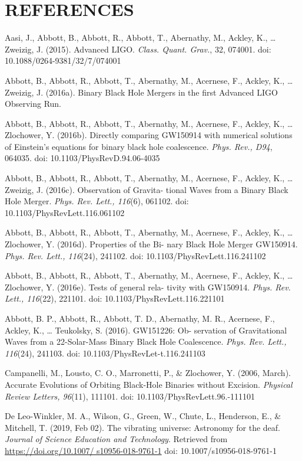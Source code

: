 \documentclass[11.5pt]{sig-alternate} %
\begin{document}
\section*{REFERENCES}\par 
\leftskip 0.25in
\parindent -0.25in 


Aasi, J., Abbott, B., Abbott, R., Abbott, T., Abernathy, M., Ackley, K., … Zweizig, J. (2015). Advanced LIGO. \textit{Class. Quant. Grav.}, 32, 074001. doi: 10.1088/0264-9381/32/7/074001 

Abbott, B., Abbott, R., Abbott, T., Abernathy, M., Acernese, F., Ackley, K., … Zweizig, J. (2016a). Binary Black Hole Mergers in the first Advanced LIGO Observing Run. 

Abbott, B., Abbott, R., Abbott, T., Abernathy, M., Acernese, F., Ackley, K., … Zlochower, Y. (2016b). Directly comparing GW150914 with numerical solutions of Einstein’s equations for binary black hole coalescence. \textit{Phys. Rev., D94}, 064035. doi: 10.1103/PhysRevD.94.06-4035 

Abbott, B., Abbott, R., Abbott, T., Abernathy, M., Acernese, F., Ackley, K., … Zweizig, J. (2016c). Observation of Gravita- tional Waves from a Binary Black Hole Merger. \textit{Phys. Rev. Lett., 116}(6), 061102. doi: 10.1103/PhysRevLett.116.061102 

Abbott, B., Abbott, R., Abbott, T., Abernathy, M., Acernese, F., Ackley, K., … Zlochower, Y. (2016d). Properties of the Bi- nary Black Hole Merger GW150914. \textit{Phys. Rev. Lett., 116}(24), 241102. doi: 10.1103/PhysRevLett.116.241102 

Abbott, B., Abbott, R., Abbott, T., Abernathy, M., Acernese, F., Ackley, K., … Zlochower, Y. (2016e). Tests of general rela- tivity with GW150914. \textit{Phys. Rev. Lett., 116}(22), 221101. doi: 10.1103/PhysRevLett.116.221101 

Abbott, B. P., Abbott, R., Abbott, T. D., Abernathy, M. R., Acernese, F., Ackley, K., … Teukolsky, S. (2016). GW151226: Ob- servation of Gravitational Waves from a 22-Solar-Mass Binary Black Hole Coalescence. \textit{Phys. Rev. Lett., 116}(24), 241103. doi: 10.1103/PhysRevLet-t.116.241103 

Campanelli, M., Lousto, C. O., Marronetti, P., \& Zlochower, Y. (2006, March). Accurate Evolutions of Orbiting Black-Hole Binaries without Excision. \textit{Physical Review Letters, 96}(11), 111101. doi: 10.1103/PhysRevLett.96.-111101 

De Leo-Winkler, M. A., Wilson, G., Green, W., Chute, L., Henderson, E., \& Mitchell, T. (2019, Feb 02). The vibrating universe: Astronomy for the deaf. \textit{Journal of Science Education and Technology}. Retrieved from \url{https://doi.org/10.1007/ s10956-018-9761-1} doi: 10.1007/s10956-018-9761-1
\end{document}
